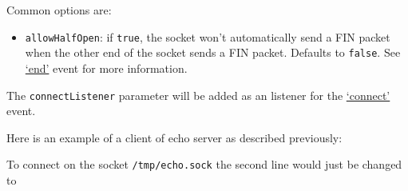 Common options are:

\begin{itemize}
\itemsep1pt\parskip0pt
\item
  \texttt{allowHalfOpen}: if \texttt{true}, the socket won't
  automatically send a FIN packet when the other end of the socket sends
  a FIN packet. Defaults to \texttt{false}. See
  \hyperref[netux5feventux5fend]{`end'} event for more information.
\end{itemize}

The \texttt{connectListener} parameter will be added as an listener for
the \hyperref[netux5feventux5fconnect]{`connect'} event.

Here is an example of a client of echo server as described previously:

\begin{Shaded}
\begin{Highlighting}[]
 \NormalTok{(}\NormalTok{);}
 \NormalTok{(\{}\NormalTok{: }\NormalTok{\},}
    \NormalTok{() \{ }
  \NormalTok{(}\NormalTok{);}
  \NormalTok{(}\NormalTok{);}
\NormalTok{\});}
\NormalTok{(}\NormalTok{, }
  \NormalTok{(}\NormalTok{());}
  \NormalTok{();}
\NormalTok{\});}
\NormalTok{(}\NormalTok{, }\NormalTok{() \{}
  \NormalTok{(}\NormalTok{);}
\NormalTok{\});}
\end{Highlighting}
\end{Shaded}

To connect on the socket \texttt{/tmp/echo.sock} the second line would
just be changed to

\begin{Shaded}
\begin{Highlighting}[]
 \NormalTok{(\{}\NormalTok{: }\NormalTok{\});}
\end{Highlighting}
\end{Shaded}

